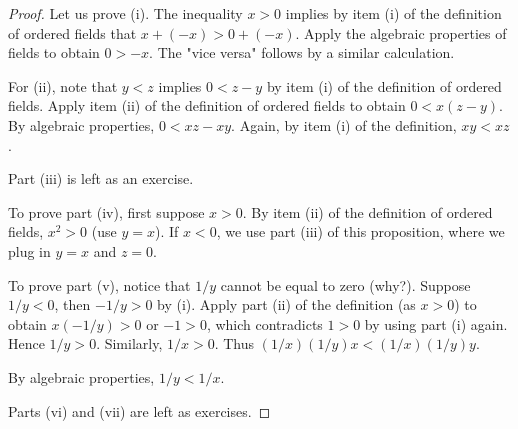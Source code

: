 \documentclass[../main.tex]{subfiles}
\begin{document}
\begin{proof}
Let us prove (i). The inequality \( x > 0 \) implies by item (i) of the definition of ordered fields that \( x + (-x) > 0 + (-x) \). Apply the algebraic properties of fields to obtain \( 0 > -x \). The "vice versa" follows by a similar calculation.

For (ii), note that \( y < z \) implies \( 0 < z - y \) by item (i) of the definition of ordered fields. Apply item (ii) of the definition of ordered fields to obtain \( 0 < x(z - y) \). By algebraic properties, \( 0 < xz - xy \). Again, by item (i) of the definition, \( xy < xz \).

Part (iii) is left as an exercise.

To prove part (iv), first suppose \( x > 0 \). By item (ii) of the definition of ordered fields, \( x^2 > 0 \) (use \( y = x \)). If \( x < 0 \), we use part (iii) of this proposition, where we plug in \( y = x \) and \( z = 0 \).

To prove part (v), notice that \( 1/y \) cannot be equal to zero (why?). Suppose \( 1/y < 0 \), then \( -1/y > 0 \) by (i). Apply part (ii) of the definition (as \( x > 0 \)) to obtain \( x(-1/y) > 0 \) or \( -1 > 0 \), which contradicts \( 1 > 0 \) by using part (i) again. Hence \( 1/y > 0 \). Similarly, \( 1/x > 0 \). Thus \( (1/x)(1/y) x < (1/x)(1/y) y \).

By algebraic properties, \( 1/y < 1/x \).

Parts (vi) and (vii) are left as exercises.
 
\end{proof}
\end{document}
